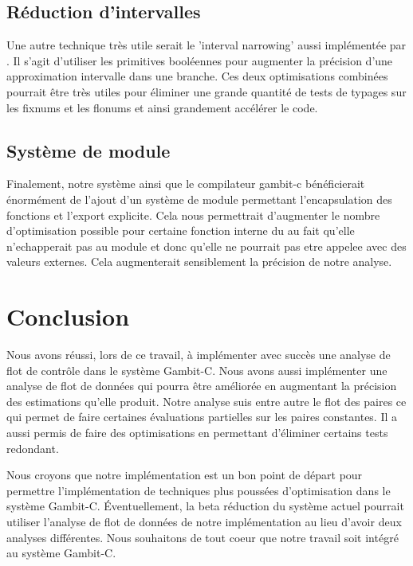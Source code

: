 \subsection{Réduction d'intervalles}

Une autre technique très utile serait le 'interval narrowing' aussi
implémentée par \cite{boucher2000}.  Il s'agit d'utiliser les
primitives booléennes pour augmenter la précision d'une approximation
intervalle dans une branche. Ces deux optimisations combinées pourrait
être très utiles pour éliminer une grande quantité de tests de
typages sur les fixnums et les flonums et ainsi grandement accélérer
le code.

\subsection{Système de module}

Finalement, notre système ainsi que le compilateur gambit-c
bénéficierait énormément de l'ajout d'un système de module permettant
l'encapsulation des fonctions et l'export explicite. Cela nous
permettrait d'augmenter le nombre d'optimisation possible pour
certaine fonction interne du au fait qu'elle n'echapperait pas au
module et donc qu'elle ne pourrait pas etre appelee avec des valeurs
externes. Cela augmenterait sensiblement la précision de notre
analyse.


\section{Conclusion}

Nous avons réussi, lors de ce travail, à implémenter avec succès une
analyse de flot de contrôle dans le système Gambit-C. Nous avons aussi
implémenter une analyse de flot de données qui pourra être améliorée
en augmentant la précision des estimations qu'elle produit. Notre
analyse suis entre autre le flot des paires ce qui permet de faire
certaines évaluations partielles sur les paires constantes. Il a aussi
permis de faire des optimisations en permettant d'éliminer certains
tests redondant.

Nous croyons que notre implémentation est un bon point de départ pour
permettre l'implémentation de techniques plus poussées d'optimisation
dans le système Gambit-C. Éventuellement, la beta réduction du système
actuel pourrait utiliser l'analyse de flot de données de notre
implémentation au lieu d'avoir deux analyses différentes. Nous
souhaitons de tout coeur que notre travail soit intégré au système
Gambit-C.
